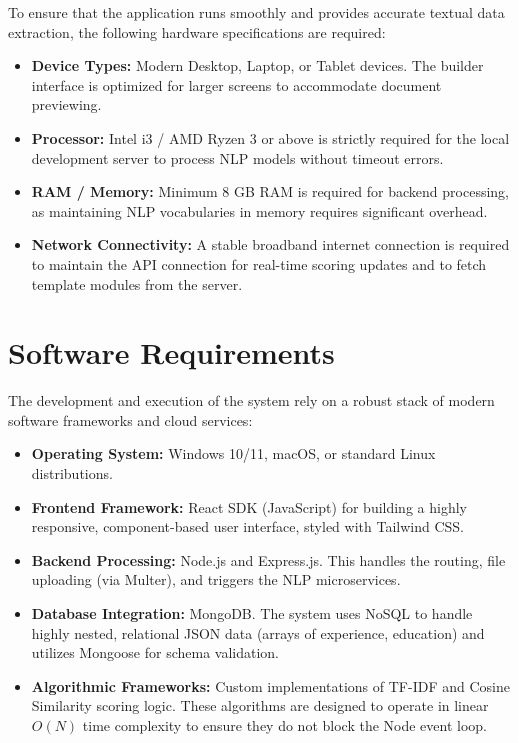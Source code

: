 \documentclass[12pt,a4paper]{report}
\begin{document}
To ensure that the application runs smoothly and provides accurate textual data extraction, the following hardware specifications are required:

\begin{itemize}
\item \textbf{Device Types:} Modern Desktop, Laptop, or Tablet devices. The builder interface is optimized for larger screens to accommodate document previewing.
\item \textbf{Processor:} Intel i3 / AMD Ryzen 3 or above is strictly required for the local development server to process NLP models without timeout errors.
\item \textbf{RAM / Memory:} Minimum 8 GB RAM is required for backend processing, as maintaining NLP vocabularies in memory requires significant overhead.
\item \textbf{Network Connectivity:} A stable broadband internet connection is required to maintain the API connection for real-time scoring updates and to fetch template modules from the server.
\end{itemize}

\section{Software Requirements}

The development and execution of the system rely on a robust stack of modern software frameworks and cloud services:

\begin{itemize}
\item \textbf{Operating System:} Windows 10/11, macOS, or standard Linux distributions.
\item \textbf{Frontend Framework:} React SDK (JavaScript) for building a highly responsive, component-based user interface, styled with Tailwind CSS.
\item \textbf{Backend Processing:} Node.js and Express.js. This handles the routing, file uploading (via Multer), and triggers the NLP microservices.
\item \textbf{Database Integration:} MongoDB. The system uses NoSQL to handle highly nested, relational JSON data (arrays of experience, education) and utilizes Mongoose for schema validation.
\item \textbf{Algorithmic Frameworks:} Custom implementations of TF-IDF and Cosine Similarity scoring logic. These algorithms are designed to operate in linear $O(N)$ time complexity to ensure they do not block the Node event loop.
\end{itemize}
\end{document}
